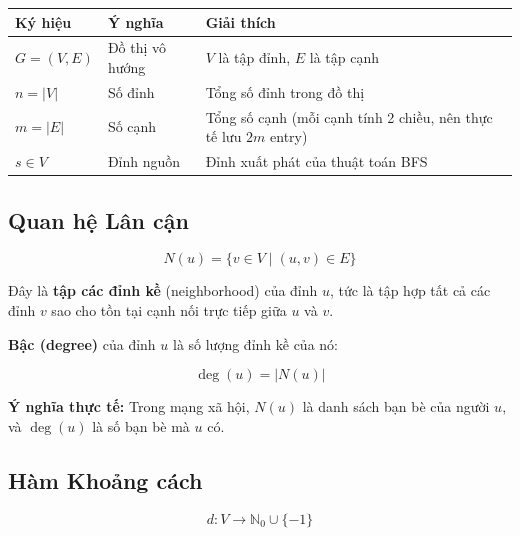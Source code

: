 \documentclass[12pt,a4paper]{article}
\begin{document}
\begin{table}[H]
\centering
\begin{tabularx}{\textwidth}{llX}
\toprule
\textbf{Ký hiệu} & \textbf{Ý nghĩa} & \textbf{Giải thích} \\
\midrule
$G = (V, E)$ & Đồ thị vô hướng & $V$ là tập đỉnh, $E$ là tập cạnh \\
$n = |V|$ & Số đỉnh & Tổng số đỉnh trong đồ thị \\
$m = |E|$ & Số cạnh & Tổng số cạnh (mỗi cạnh tính 2 chiều, nên thực tế lưu $2m$ entry) \\
$s \in V$ & Đỉnh nguồn & Đỉnh xuất phát của thuật toán BFS \\
\bottomrule
\end{tabularx}
\end{table}

\subsection{Quan hệ Lân cận}

\begin{equation}
N(u) = \{v \in V \mid (u, v) \in E\}
\end{equation}

Đây là \textbf{tập các đỉnh kề} (neighborhood) của đỉnh $u$, tức là tập hợp tất cả các đỉnh $v$ sao cho tồn tại cạnh nối trực tiếp giữa $u$ và $v$.

\textbf{Bậc (degree)} của đỉnh $u$ là số lượng đỉnh kề của nó:

\begin{equation}
\deg(u) = |N(u)|
\end{equation}

\begin{explain}
\textbf{Ý nghĩa thực tế:} Trong mạng xã hội, $N(u)$ là danh sách bạn bè của người $u$, và $\deg(u)$ là số bạn bè mà $u$ có.
\end{explain}

\subsection{Hàm Khoảng cách}

\begin{equation}
d: V \rightarrow \mathbb{N}_0 \cup \{-1\}
\end{equation}
\end{document}
